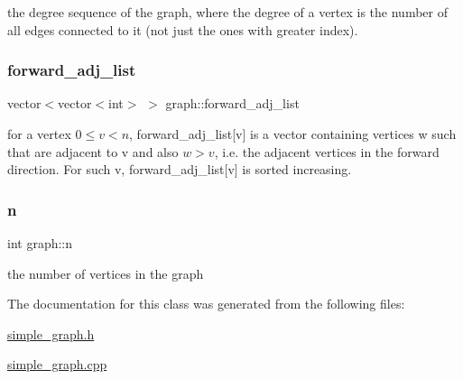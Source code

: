 the degree sequence of the graph, where the degree of a vertex is the number of all edges connected to it (not just the ones with greater index). 

\mbox{\label{classgraph_a7d6441850d586d6a99fb73df57b70362}} 
\subsubsection{\texorpdfstring{forward\+\_\+adj\+\_\+list}{forward\_adj\_list}}
{\footnotesize\ttfamily vector$<$vector$<$int$>$ $>$ graph\+::forward\+\_\+adj\+\_\+list\hspace{0.3cm}{\ttfamily [private]}}



for a vertex $0 \leq v < n$, forward\+\_\+adj\+\_\+list\mbox{[}v\mbox{]} is a vector containing vertices w such that are adjacent to v and also $w > v$, i.\+e. the adjacent vertices in the forward direction. For such v, forward\+\_\+adj\+\_\+list\mbox{[}v\mbox{]} is sorted increasing. 

\mbox{\label{classgraph_ac8b3474ce95c04087c312508ec1443b6}} 
\subsubsection{\texorpdfstring{n}{n}}
{\footnotesize\ttfamily int graph\+::n\hspace{0.3cm}{\ttfamily [private]}}



the number of vertices in the graph 



The documentation for this class was generated from the following files\+:\begin{DoxyCompactItemize}
\item 
\hyperlink{simple__graph_8h}{simple\+\_\+graph.\+h}\item 
\hyperlink{simple__graph_8cpp}{simple\+\_\+graph.\+cpp}\end{DoxyCompactItemize}
